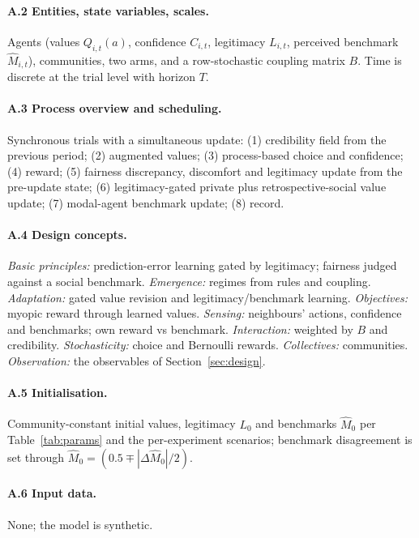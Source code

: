 \documentclass[11pt]{article}
\newcommand{\1}{\mathbf{1}}
\begin{document}
\paragraph{A.2 Entities, state variables, scales.}
Agents (values $Q_{i,t}(a)$, confidence $C_{i,t}$, legitimacy $L_{i,t}$, perceived
benchmark $\hat M_{i,t}$), communities, two arms, and a row-stochastic coupling
matrix $B$. Time is discrete at the trial level with horizon $T$.

\paragraph{A.3 Process overview and scheduling.}
Synchronous trials with a simultaneous update: (1) credibility field from the
previous period; (2) augmented values; (3) process-based choice and confidence;
(4) reward; (5) fairness discrepancy, discomfort and legitimacy update from the
pre-update state; (6) legitimacy-gated private plus retrospective-social value
update; (7) modal-agent benchmark update; (8) record.

\paragraph{A.4 Design concepts.}
\emph{Basic principles:} prediction-error learning gated by legitimacy; fairness
judged against a social benchmark. \emph{Emergence:} regimes from rules and
coupling. \emph{Adaptation:} gated value revision and legitimacy/benchmark
learning. \emph{Objectives:} myopic reward through learned values.
\emph{Sensing:} neighbours' actions, confidence and benchmarks; own reward vs
benchmark. \emph{Interaction:} weighted by $B$ and credibility.
\emph{Stochasticity:} choice and Bernoulli rewards. \emph{Collectives:}
communities. \emph{Observation:} the observables of Section~\ref{sec:design}.

\paragraph{A.5 Initialisation.}
Community-constant initial values, legitimacy $L_0$ and benchmarks $\hat M_0$ per
Table~\ref{tab:params} and the per-experiment scenarios; benchmark disagreement is
set through $\hat M_0=(0.5\mp|\Delta\hat M_0|/2)$.

\paragraph{A.6 Input data.} None; the model is synthetic.
\end{document}
